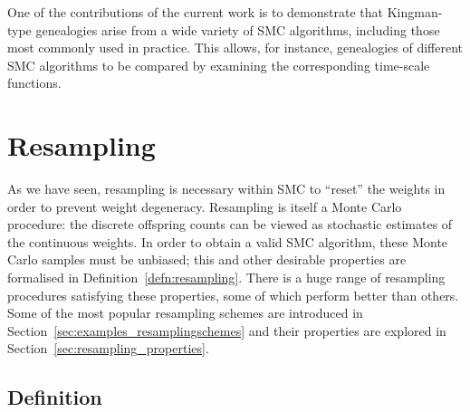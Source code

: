 One of the contributions of the current work is to demonstrate that Kingman-type genealogies arise from a wide variety of SMC algorithms, including those most commonly used in practice.
This allows, for instance, genealogies of different SMC algorithms to be compared by examining the corresponding time-scale functions.





\section{Resampling}
\label{sec:resampling}
As we have seen, resampling is necessary within SMC to ``reset'' the weights in order to prevent weight degeneracy.
Resampling is itself a Monte Carlo procedure: the discrete offspring counts can be viewed as stochastic estimates of the continuous weights.
In order to obtain a valid SMC algorithm, these Monte Carlo samples must be unbiased; this and other desirable properties are formalised in Definition~\ref{defn:resampling}.
There is a huge range of resampling procedures satisfying these properties, some of which perform better than others. 
Some of the most popular resampling schemes are introduced in Section~\ref{sec:examples_resamplingschemes} and their properties are explored in Section~\ref{sec:resampling_properties}.




\subsection{Definition}

